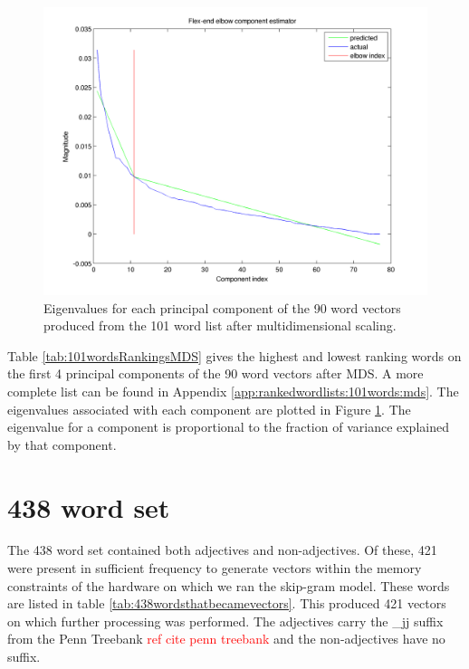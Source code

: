 \documentclass[10pt,letterpaper]{book}
\newcommand{\todo}[1]{\textcolor{red}{#1}}
\begin{document}
\begin{figure}[!htbp]
    \includegraphics[width=0.9\linewidth]{100words-adj-800dim-lowercase_wmt_model-mds_transformed-flex_end_elbow}
    \caption{Eigenvalues for each principal component of the 90 word vectors
    produced from the 101 word list after multidimensional scaling.}
    \label{fig:101wordsmdseigenvalues}
\end{figure}

Table \ref{tab:101wordsRankingsMDS} gives the highest and lowest
ranking words on the first 4 principal components of the 90 word 
vectors after MDS. A more complete list can be found in Appendix 
\ref{app:rankedwordlists:101words:mds}. The eigenvalues associated 
with each component are plotted in Figure 
\ref{fig:101wordsmdseigenvalues}. The eigenvalue for a component is
proportional to the fraction of variance explained by that component.


\section{438 word set}

The 438 word set contained both adjectives and non-adjectives. Of these, 421 
were present in sufficient frequency to generate vectors within the memory 
constraints of the hardware on which we ran the skip-gram model. These words are 
listed in table \ref{tab:438wordsthatbecamevectors}. This produced 421 vectors 
on which further processing was performed. The adjectives carry the \_jj suffix 
from the Penn Treebank \todo{ref cite penn treebank} and the non-adjectives have 
no suffix.


\end{document}
